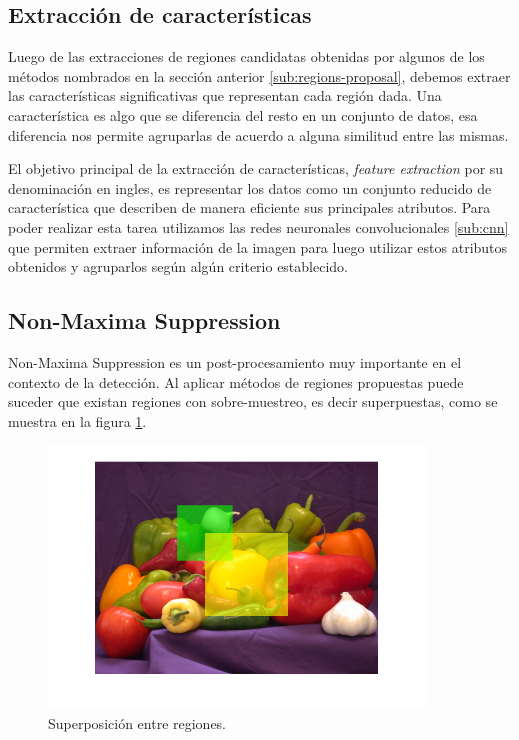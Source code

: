 \subsection{Extracción de características}\label{sub:features-extraction}

Luego de las extracciones de regiones candidatas obtenidas por algunos de los métodos nombrados en la sección anterior \ref{sub:regions-proposal}, debemos extraer las características significativas que representan cada región dada. Una  característica es algo que se diferencia del resto en un conjunto de datos, esa diferencia nos permite agruparlas de acuerdo a alguna
similitud entre las mismas. 

El objetivo principal de la  extracción de características, \textit{feature extraction} por su denominación en ingles, es representar los datos como un conjunto reducido de característica que describen de manera eficiente sus principales atributos. Para poder realizar esta tarea utilizamos  las redes neuronales convolucionales \ref{sub:cnn} que  permiten extraer información de la imagen para luego utilizar estos atributos obtenidos y agruparlos según algún criterio establecido. 


\subsection{Non-Maxima Suppression}\label{sub:nonmaximumsuppression}

Non-Maxima Suppression es un post-procesamiento muy importante en el contexto de la detección. Al aplicar métodos de regiones propuestas puede suceder que existan regiones con sobre-muestreo, es decir superpuestas, como se muestra en la figura  \ref{Fig: overlapping}. 

\begin{figure}[H]
 \centering
  \includegraphics[height=7cm,keepaspectratio=true,clip=true]{imagenes/MarcoTeorico/overlapMat.png}
  \caption{Superposición entre regiones.} \label{Fig: overlapping}
\end{figure}

